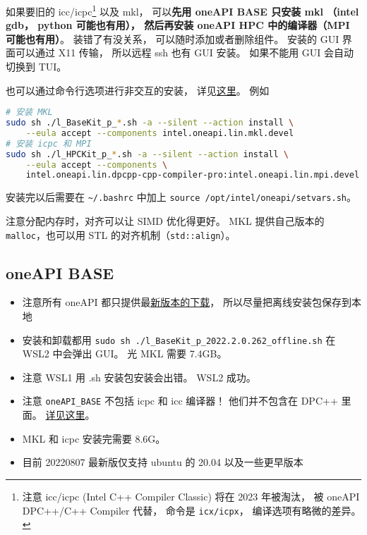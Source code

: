 

如果要旧的 icc/icpc\footnote{注意 icc/icpc (Intel C++ Compiler Classic) 将在 2023 年被淘汰， 被 oneAPI DPC++/C++ Compiler 代替， 命令是 \verb|icx/icpx|， 编译选项有略微的差异。} 以及 mkl， 可以\textbf{先用 oneAPI BASE 只安装 mkl （intel gdb， python 可能也有用）， 然后再安装 oneAPI HPC 中的编译器（MPI 可能也有用）}。
装错了有没关系， 可以随时添加或者删除组件。 安装的 GUI 界面可以通过 X11 传输， 所以远程 ssh 也有 GUI 安装。 如果不能用 GUI 会自动切换到 TUI。

也可以通过命令行选项进行非交互的安装， 详见\href{https://www.intel.com/content/www/us/en/develop/documentation/installation-guide-for-intel-oneapi-toolkits-linux/top/installation/install-with-command-line.html#install-with-command-line}{这里}。 例如
\begin{lstlisting}[language=bash]
# 安装 MKL
sudo sh ./l_BaseKit_p_*.sh -a --silent --action install \
    --eula accept --components intel.oneapi.lin.mkl.devel
# 安装 icpc 和 MPI
sudo sh ./l_HPCKit_p_*.sh -a --silent --action install \
    --eula accept --components \
    intel.oneapi.lin.dpcpp-cpp-compiler-pro:intel.oneapi.lin.mpi.devel
\end{lstlisting}

安装完以后需要在 \verb|~/.bashrc| 中加上 \verb|source /opt/intel/oneapi/setvars.sh|。

注意分配内存时，对齐可以让 SIMD 优化得更好。 MKL 提供自己版本的 \verb|malloc|，也可以用 STL 的对齐机制（\verb|std::align|）。

\subsection{oneAPI BASE}
\begin{itemize}
\item 注意所有 oneAPI 都只提供最\href{https://www.intel.com/content/www/us/en/developer/tools/oneapi/base-toolkit-download.html?operatingsystem=linux&distributions=webdownload&options=offline}{新版本的下载}， 所以尽量把离线安装包保存到本地
\item 安装和卸载都用 \verb`sudo sh ./l_BaseKit_p_2022.2.0.262_offline.sh` 在 WSL2 中会弹出 GUI。 光 MKL 需要 7.4GB。
\item 注意 WSL1 用 .sh 安装包安装会出错。 WSL2 成功。
\item 注意 \verb|oneAPI_BASE| 不包括 icpc 和 icc 编译器！ 他们并不包含在 DPC++ 里面。 \href{https://stackoverflow.com/questions/66527842/can-not-find-the-icc-compiler-after-having-installed-intel-oneapi-invoking-from}{详见这里}。
\item MKL 和 icpc 安装完需要 8.6G。
\item 目前 20220807 最新版仅支持 ubuntu 的 20.04 以及一些更早版本
\end{itemize}

